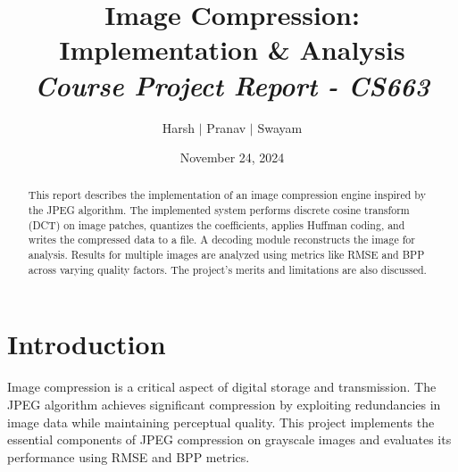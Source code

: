 \documentclass{article}
\title{\centering Image Compression: Implementation \& Analysis\\ \large{\textit{Course Project Report - CS663}}}
\author{\centering Harsh $\vert$ Pranav $\vert$ Swayam}
\date{November 24, 2024}
\begin{document}
\maketitle
\flushleft

\tableofcontents

\begin{abstract}
This report describes the implementation of an image compression engine inspired by the JPEG algorithm. The implemented system performs discrete cosine transform (DCT) on image patches, quantizes the coefficients, applies Huffman coding, and writes the compressed data to a file. A decoding module reconstructs the image for analysis. Results for multiple images are analyzed using metrics like RMSE and BPP across varying quality factors. The project's merits and limitations are also discussed.
\end{abstract}

\newpage
\section{Introduction}
Image compression is a critical aspect of digital storage and transmission. The JPEG algorithm achieves significant compression by exploiting redundancies in image data while maintaining perceptual quality. This project implements the essential components of JPEG compression on grayscale images and evaluates its performance using RMSE and BPP metrics.
\end{document}
